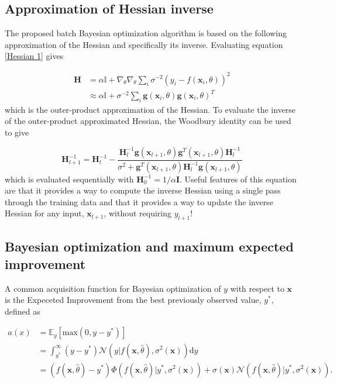 \documentclass[11pt]{article} %
\begin{document}
\clearpage
\subsection*{Approximation of Hessian inverse}
The proposed batch Bayesian optimization algorithm is based on the following approximation of the Hessian and specifically its inverse. Evaluating equation \ref{Hessian 1} gives 

\begin{align}
\mathbf{H} &= \alpha \mathbb{I} + \nabla_{\theta} \nabla_{\theta} \sum_i \sigma^{-2} (y_i - f(\mathbf{x}_i, \theta))^2  \nonumber \\
&\approx \alpha \mathbb{I} + \sigma^{-2} \sum_i \mathbf{g}(\mathbf{x}_i, \theta) \mathbf{g}(\mathbf{x}_i, \theta)^T
\end{align}
which is the outer-product approximation of the Hessian. To evaluate the inverse of the outer-product approximated Hessian, the Woodbury identity can be used to give 

\begin{equation}
\mathbf{H}_{l+1}^{-1} = \mathbf{H}_{l}^{-1} - \frac{\mathbf{H}_{l}^{-1} \mathbf{g}(\mathbf{x}_{l+1}, \theta) \mathbf{g}^T(\mathbf{x}_{l+1}, \theta) \mathbf{H}_{l}^{-1}} {\sigma^2 + \mathbf{g}^T(\mathbf{x}_{l+1}, \theta) \mathbf{H}_{l}^{-1} \mathbf{g}(\mathbf{x}_{l+1}, \theta)} 
\label{covariance update}
\end{equation}
which is evaluated sequentially with $\mathbf{H}_{0}^{-1} = 1/\alpha \mathbf{I}$. Useful features of this equation are that it provides a way to compute the inverse Hessian using a single pass through the training data and that it provides a way to update the inverse Hessian for any input, $\mathbf{x}_{l+1}$, without requiring $y_{l + 1}$!

\subsection*{Bayesian optimization and maximum expected improvement}

A common acquisition function for Bayesian optimization of $y$ with respect to $\mathbf{x}$ is the Expeceted Improvement from the best previously observed value, $y^*$, defined as 

\begin{align}
a(x) &= \mathbb{E}_{y} [ \text{max}(0, y- y^*) ]   \nonumber \\ 
&= \int_{y^*}^{\infty} (y - y^*) \mathcal{N}(y | f(\mathbf{x}, \hat{\theta}), \sigma^2(\mathbf{x})) \mathrm{d} y \nonumber \\
&= (f(\mathbf{x}, \hat{\theta}) - y^*) \Phi(f(\mathbf{x}, \hat{\theta}) | y^*, \sigma^2(\mathbf{x})) + \sigma(\mathbf{x}) \mathcal{N}(f(\mathbf{x}, \hat{\theta}) | y^*, \sigma^2(\mathbf{x})).
\label{EI}
\end{align}
\end{document}

